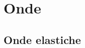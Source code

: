\documentclass[a4paper,11pt,italian]{article}
\begin{document}
\begin{description}


  
  

\end{description}


\newpage
\section{Onde}

\subsection{Onde elastiche}
\end{document}
